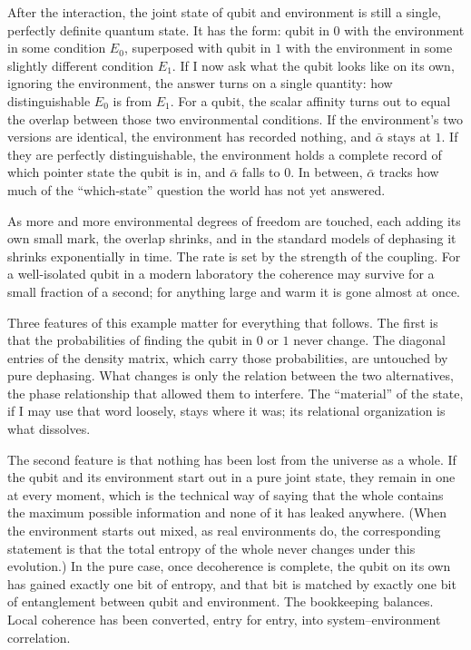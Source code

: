 After the interaction, the joint state of qubit and environment is still a single, perfectly definite quantum state.
It has the form: qubit in $0$ with the environment in some condition $E_0$, superposed with qubit in $1$ with the environment in some slightly different condition $E_1$.
If I now ask what the qubit looks like on its own, ignoring the environment, the answer turns on a single quantity: how distinguishable $E_0$ is from $E_1$.
For a qubit, the scalar affinity turns out to equal the overlap between those two environmental conditions.
If the environment's two versions are identical, the environment has recorded nothing, and $\bar{\alpha}$ stays at $1$.
If they are perfectly distinguishable, the environment holds a complete record of which pointer state the qubit is in, and $\bar{\alpha}$ falls to $0$.
In between, $\bar{\alpha}$ tracks how much of the ``which-state'' question the world has not yet answered.

As more and more environmental degrees of freedom are touched, each adding its own small mark, the overlap shrinks, and in the standard models of dephasing it shrinks exponentially in time.
The rate is set by the strength of the coupling.
For a well-isolated qubit in a modern laboratory the coherence may survive for a small fraction of a second; for anything large and warm it is gone almost at once.

Three features of this example matter for everything that follows.
The first is that the probabilities of finding the qubit in $0$ or $1$ never change.
The diagonal entries of the density matrix, which carry those probabilities, are untouched by pure dephasing.
What changes is only the relation between the two alternatives, the phase relationship that allowed them to interfere.
The ``material'' of the state, if I may use that word loosely, stays where it was; its relational organization is what dissolves.

The second feature is that nothing has been lost from the universe as a whole.
If the qubit and its environment start out in a pure joint state, they remain in one at every moment, which is the technical way of saying that the whole contains the maximum possible information and none of it has leaked anywhere.
(When the environment starts out mixed, as real environments do, the corresponding statement is that the total entropy of the whole never changes under this evolution.)
In the pure case, once decoherence is complete, the qubit on its own has gained exactly one bit of entropy, and that bit is matched by exactly one bit of entanglement between qubit and environment.
The bookkeeping balances.
Local coherence has been converted, entry for entry, into system--environment correlation.

